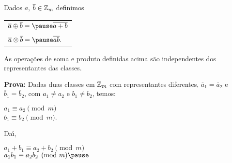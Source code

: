 \documentclass{beamer}
\begin{document}
    \begin{frame}
        \begin{definicao}
            Dados $\overline{a}$, $\overline{b} \in \mathbb{Z}_m$ definimos\pause
            \begin{center}
                \begin{tabular}{l}
                    $\overline{a}\oplus\overline{b} = \pause \overline{a + b}\label{soma_modulo_m}$\pause \\
                    \\
                    $\overline{a}\otimes\overline{b} = \pause \overline{ab}.\label{multiplicacao_modulo_m}$\pause
                \end{tabular}
            \end{center}
        \end{definicao}

        \begin{proposicao}
            As opera{\c c}{\~o}es de soma \pause e produto \pause definidas acima s{\~a}o independentes dos representantes das classes.\pause
        \end{proposicao}
        \noindent \textbf{Prova:}
            Dadas duas classes em $\mathbb{Z}_m$ com representantes diferentes, \pause $\overline{a}_{1} = \overline{a}_{2}$ e \pause $\overline{b}_{1} = \overline{b}_{2}$, \pause com $a_{1}\ne a_{2}$ \pause e $b_{1}\ne b_{2}$, \pause temos:\pause
            \begin{center}
                $a_1 \equiv a_2 \pmod m$\pause\\
                $b_1 \equiv b_2 \pmod m$.\pause
            \end{center}
            Da{\'\i},
            \begin{center}
                $a_1 + b_1 \equiv a_2 + b_2 \pmod m$\pause\\
                $a_1b_1 \equiv a_2b_2 \pmod m\pause$\\
            \end{center}
    \end{frame}
\end{document}
